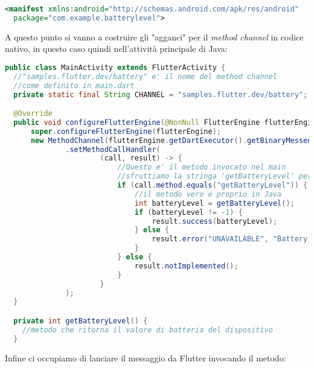 \begin{lstlisting}[language=XML, firstnumber=1,caption={Android \textit{manifest}}]
<manifest xmlns:android="http://schemas.android.com/apk/res/android"
  package="com.example.batterylevel">
\end{lstlisting}

A questo punto si vanno a costruire gli "agganci" per il \textit{method channel} in codice nativo, in questo caso quindi nell'attività principale di Java:

\begin{lstlisting}[language=Java, firstnumber=1,caption={Java \textit{main activity}}]
public class MainActivity extends FlutterActivity {
  //"samples.flutter.dev/battery" e' il nome del method channel
  //come definito in main.dart
  private static final String CHANNEL = "samples.flutter.dev/battery";

  @Override
  public void configureFlutterEngine(@NonNull FlutterEngine flutterEngine) {
      super.configureFlutterEngine(flutterEngine);
      new MethodChannel(flutterEngine.getDartExecutor().getBinaryMessenger(), CHANNEL)
              .setMethodCallHandler(
                      (call, result) -> {
                          //Questo e' il metodo invocato nel main
                          //sfruttiamo la stringa 'getBatteryLevel' per invocarlo
                          if (call.method.equals("getBatteryLevel")) {
                              //il metodo vero e proprio in Java
                              int batteryLevel = getBatteryLevel();
                              if (batteryLevel != -1) {
                                  result.success(batteryLevel);
                              } else {
                                  result.error("UNAVAILABLE", "Battery level not available.", null);
                              }
                          } else {
                              result.notImplemented();
                          }
                      }
              );
  }

  private int getBatteryLevel() {
    //metodo che ritorna il valore di batteria del dispositivo
  }
\end{lstlisting}

Infine ci occupiamo di lanciare il messaggio da Flutter invocando il metodo:

